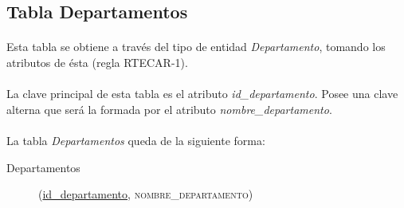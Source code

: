    \subsection{Tabla Departamentos}

      \paragraph{}Esta tabla se obtiene a través del tipo de entidad
      \textit{Departamento}, tomando los atributos de ésta (regla RTECAR-1).

      \paragraph{}La clave principal de esta tabla es el atributo
      \textit{id\_departamento}. Posee una clave alterna que será la formada por
      el atributo \textit{nombre\_departamento}.

      \paragraph{}La tabla \textit{Departamentos} queda de la siguiente forma:

      \begin{description}
         \item[Departamentos] \begin{flushleft}(\underline{id\_departamento},
         \textsc{nombre\_departamento})\end{flushleft}
      \end{description}
